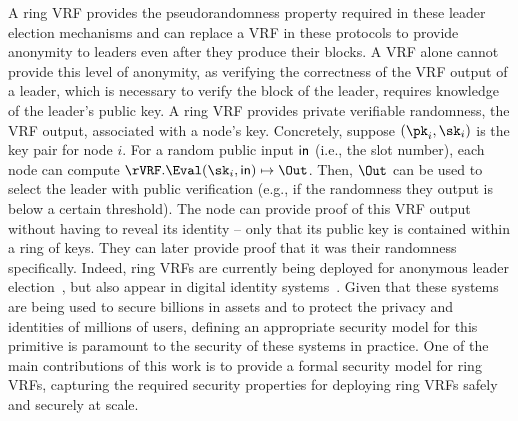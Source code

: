 A ring VRF provides the pseudorandomness property required in these leader election mechanisms and can replace a VRF in these protocols to provide anonymity to leaders even after they produce their blocks.
A VRF alone cannot provide this level of anonymity, as verifying the correctness of the VRF output  of a leader, which is necessary to verify the block of the leader, requires knowledge of the leader's public key.
A ring VRF provides private verifiable
randomness, the VRF output, associated with a node's key.
Concretely, suppose $(\pk_i, \sk_i)$ is the key pair for node $i$.
For a random public input $\mathsf{in}$ (i.e., the slot number),
each node can compute $\rVRF.\Eval(\sk_i,\msg) \mapsto \Out$. Then,
$\Out$ can be used to select the leader with public verification (e.g., if the randomness they output is below a certain threshold).
The node can provide proof of
this VRF output without having to reveal its identity -- only that its public key is contained within a ring of keys.
They can later provide proof that it was their randomness specifically.
Indeed, ring VRFs are currently being deployed for anonymous leader election~\cite{BurdgesASV23a}, but also appear in digital identity systems~\cite{Semaphore,Worldcoin}.
Given that these systems are being used to secure billions in assets and to protect the privacy and identities of millions of users,
defining an appropriate security model for this primitive is paramount to the security of these systems in practice.
One of the main contributions of this work is to provide a formal security model for ring VRFs, capturing the required security properties for deploying ring VRFs safely and securely at scale.

